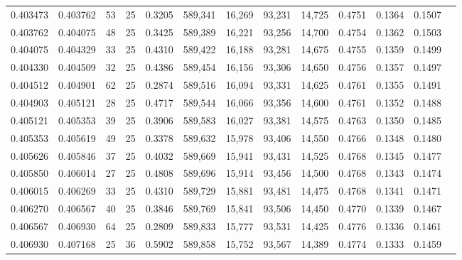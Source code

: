 \begin{tabular}{rrrrrrrrrrrrr}
0.403473 & 0.403762 &    53 &  25 &                                     0.3205 & 589,341 &  16,269 &  93,231 &  14,725 & 0.4751 & 0.1364 & 0.1507 \\
0.403762 & 0.404075 &    48 &  25 &                                     0.3425 & 589,389 &  16,221 &  93,256 &  14,700 & 0.4754 & 0.1362 & 0.1503 \\
0.404075 & 0.404329 &    33 &  25 &                                     0.4310 & 589,422 &  16,188 &  93,281 &  14,675 & 0.4755 & 0.1359 & 0.1499 \\
0.404330 & 0.404509 &    32 &  25 &                                     0.4386 & 589,454 &  16,156 &  93,306 &  14,650 & 0.4756 & 0.1357 & 0.1497 \\
0.404512 & 0.404901 &    62 &  25 &                                     0.2874 & 589,516 &  16,094 &  93,331 &  14,625 & 0.4761 & 0.1355 & 0.1491 \\
0.404903 & 0.405121 &    28 &  25 &                                     0.4717 & 589,544 &  16,066 &  93,356 &  14,600 & 0.4761 & 0.1352 & 0.1488 \\
0.405121 & 0.405353 &    39 &  25 &                                     0.3906 & 589,583 &  16,027 &  93,381 &  14,575 & 0.4763 & 0.1350 & 0.1485 \\
0.405353 & 0.405619 &    49 &  25 &                                     0.3378 & 589,632 &  15,978 &  93,406 &  14,550 & 0.4766 & 0.1348 & 0.1480 \\
0.405626 & 0.405846 &    37 &  25 &                                     0.4032 & 589,669 &  15,941 &  93,431 &  14,525 & 0.4768 & 0.1345 & 0.1477 \\
0.405850 & 0.406014 &    27 &  25 &                                     0.4808 & 589,696 &  15,914 &  93,456 &  14,500 & 0.4768 & 0.1343 & 0.1474 \\
0.406015 & 0.406269 &    33 &  25 &                                     0.4310 & 589,729 &  15,881 &  93,481 &  14,475 & 0.4768 & 0.1341 & 0.1471 \\
0.406270 & 0.406567 &    40 &  25 &                                     0.3846 & 589,769 &  15,841 &  93,506 &  14,450 & 0.4770 & 0.1339 & 0.1467 \\
0.406567 & 0.406930 &    64 &  25 &                                     0.2809 & 589,833 &  15,777 &  93,531 &  14,425 & 0.4776 & 0.1336 & 0.1461 \\
0.406930 & 0.407168 &    25 &  36 &                                     0.5902 & 589,858 &  15,752 &  93,567 &  14,389 & 0.4774 & 0.1333 & 0.1459 \\

\end{tabular}
